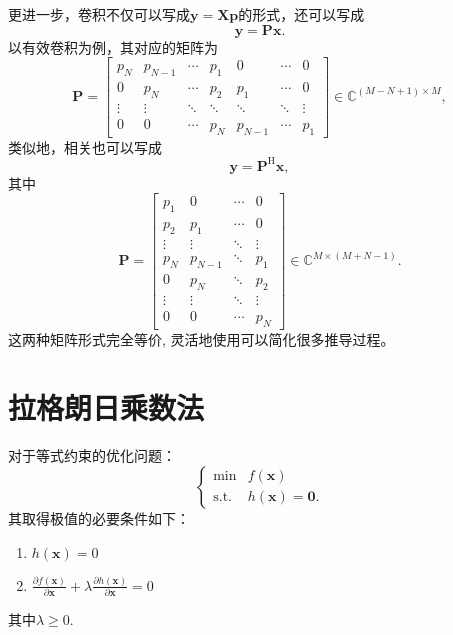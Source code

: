 更进一步，卷积不仅可以写成\( \bm{y} = \mathbf{X} \bm{p} \)的形式，还可以写成
\[
    \bm{y} = \mathbf{P} \bm{x}.
\]
以有效卷积为例，其对应的矩阵为
\[
    \mathbf{P} =
    \begin{bmatrix}
        p_N    & p_{N-1} & \cdots & p_1    & 0       & \cdots & 0      \\
        0      & p_N     & \cdots & p_2    & p_1     & \cdots & 0      \\
        \vdots & \vdots  & \ddots & \ddots & \ddots  & \ddots & \vdots \\
        0      & 0       & \cdots & p_N    & p_{N-1} & \cdots & p_1
    \end{bmatrix}
    \in \mathbb{C}^{(M-N+1) \times M},
\]
类似地，相关也可以写成
\[
    \bm{y} = \mathbf{P}^{\mathrm{H}} \bm{x},
\]
其中
\[
    \mathbf{P} =
    \begin{bmatrix}
        p_1    & 0       & \cdots & 0      \\
        p_2    & p_1     & \cdots & 0      \\
        \vdots & \vdots  & \ddots & \vdots \\
        p_N    & p_{N-1} & \ddots & p_1    \\
        0      & p_N     & \ddots & p_2    \\
        \vdots & \vdots  & \ddots & \vdots \\
        0      & 0       & \cdots & p_N
    \end{bmatrix}
    \in \mathbb{C}^{M \times (M+N-1)}.
\]
这两种矩阵形式完全等价, 灵活地使用可以简化很多推导过程。


\section{拉格朗日乘数法}\label{apx.lagrange-multiplier}
对于等式约束的优化问题：
\[
    \begin{cases}
        \min          & f(\bm{x})           \\
        \mathrm{s.t.} & h(\bm{x}) = \bm{0}.
    \end{cases}
\]
其取得极值的必要条件如下：
\begin{enumerate}
    \item \( h(\bm{x}) = 0 \)
    \item \( \frac{\partial f(\bm{x})}{\partial \bm{x}} + \lambda \frac{\partial h(\bm{x})}{\partial \bm{x}} = 0 \)
\end{enumerate}
其中\( \lambda \geq 0 \).

